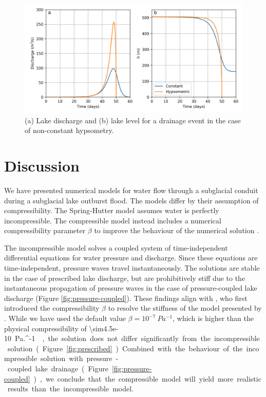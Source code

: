 \documentclass[11pt]{article}
\begin{document}
\begin{figure}[t]
\centering
\includegraphics[width=5in]{hypsometry_discharge.png}
\caption{(a) Lake discharge and (b) lake level for a drainage event in the case of non-constant hypsometry.}
\label{fig:hypsometry}
\end{figure}


\section{Discussion}
We have presented numerical models for water flow through a subglacial conduit during a subglacial lake outburst flood. The models differ by their assumption of compressibility. The Spring-Hutter model assumes water is perfectly incompressible. The compressible model instead includes a numerical compressibility parameter $\beta$ to improve the behaviour of the numerical solution \citep{clarke2003}.

The incompressible model solves a coupled system of time-independent differential equations for water pressure and discharge. Since these equations are time-independent, pressure waves travel instantaneously. The solutions are stable in the case of prescribed lake discharge, but are prohibitively stiff due to the instantaneous propagation of pressure waves in the case of pressure-coupled lake discharge (Figure \ref{fig:pressure-coupled}). These findings align with \citet{clarke2003}, who first introduced the compressibility $\beta$ to resolve the stiffness of the model presented by \citet{spring1981}. While we have used the default value $\beta = 10^{-7}\SI{}{Pa^{-1}}$, which is higher than the physical compressibility of \SI{\sim4.5e-10}{Pa.^{-1}} \citep{clarke2003}, the solution does not differ significantly from the incompressible solution (Figure \ref{fig:prescribed}). Combined with the behaviour of the incompressible solution with pressure-coupled lake drainage (Figure \ref{fig:pressure-coupled}), we conclude that the compressible model will yield more realistic results than the incompressible model.
\end{document}
